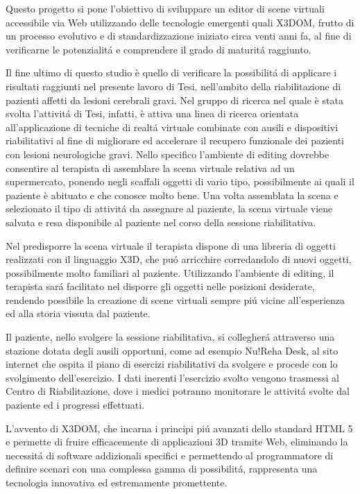 Questo progetto si pone l'obiettivo di sviluppare un editor di scene virtuali accessibile via Web utilizzando delle tecnologie emergenti quali X3DOM, frutto di un processo evolutivo e di standardizzazione iniziato circa venti anni fa, al fine di  verificarne le potenzialit\'{a} e comprendere il grado di maturit\'{a} raggiunto. 

Il fine ultimo di questo studio \`{e} quello di verificare la possibilit\'{a} di applicare i risultati raggiunti nel presente lavoro di Tesi, nell'ambito della riabilitazione  di pazienti affetti da lesioni cerebrali gravi. Nel gruppo di ricerca nel quale \`{e} stata svolta l'attivit\'{a} di Tesi, infatti, \`{e} attiva una linea di ricerca\cite{VirtualReality} orientata all'applicazione di tecniche di realt\'{a} virtuale combinate con ausili e dispositivi riabilitativi al fine di migliorare ed accelerare il recupero funzionale dei pazienti con lesioni neurologiche gravi. Nello specifico l'ambiente di editing dovrebbe consentire al terapista di assemblare la scena virtuale relativa ad un supermercato, ponendo negli scaffali oggetti di vario tipo, possibilmente ai quali il paziente \`{e} abituato e che conosce molto bene. Una volta assemblata la scena e selezionato il tipo di attivit\'{a} da assegnare al paziente, la scena virtuale viene salvata e resa disponibile al paziente nel corso della sessione riabilitativa.

Nel predisporre la scena virtuale il terapista dispone di una libreria di oggetti realizzati con il linguaggio X3D,  che pu\'{o} arricchire corredandolo di nuovi oggetti, possibilmente molto familiari al paziente. Utilizzando l'ambiente di editing, il terapista sar\'{a} facilitato nel disporre gli oggetti nelle posizioni desiderate, rendendo possibile la creazione di scene virtuali sempre pi\'{u} vicine all'esperienza ed alla storia vissuta dal paziente.

Il paziente,  nello svolgere la sessione riabilitativa, si collegher\'{a} attraverso una stazione dotata degli ausili opportuni, come ad esempio Nu!Reha Desk\cite{nurDesk}, al sito internet che ospita il piano di esercizi riabilitativi da svolgere e procede con lo svolgimento dell'esercizio. I dati inerenti l'esercizio svolto vengono trasmessi al Centro di Riabilitazione, dove i medici potranno monitorare le attivit\'{a} svolte dal paziente ed i progressi effettuati.

L'avvento di X3DOM, che incarna i principi pi\'{u} avanzati dello standard HTML 5 e permette di fruire efficacemente di applicazioni 3D tramite Web, eliminando la necessit\'{a} di software addizionali specifici e permettendo al programmatore di definire scenari con una complessa gamma di possibilit\'{a}, rappresenta una tecnologia innovativa ed estremamente promettente.

